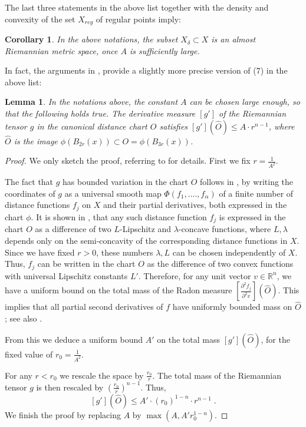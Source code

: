 \documentclass[12pt,leqno,intlimits]{amsart}
\numberwithin{equation}{section}
\newtheorem{lem}[thm]{Lemma}
\newtheorem{cor}[thm]{Corollary}
\theoremstyle{definition}
\theoremstyle{remark}
\newcommand{\R}{\mathbb{R}}
\begin{document}
  The last three statements in the above list together with the density and convexity of the set $X_{reg}$ of regular points imply:
  \begin{cor}
  In the above notations, the subset $X_{\delta} \subset X$ is an almost Riemannian metric space, once $A$ is sufficiently large.
  \end{cor}



In fact,  the arguments in \cite[4.2]{Per-DC},  provide a slightly more precise version of (7) in the above list:

\begin{lem} \label{lem:A}
In the notations above,  the constant $A$ can be chosen  large enough, so that the following holds true.    The derivative measure $[g']$ of the Riemannian tensor $g$
in the canonical distance chart $O$ satisfies $[g'] (\hat O) \leq A \cdot  r^{n-1} $, where $\hat O$ is the image $\phi (B_{2r} (x)) \subset O=
\phi (B_{3r} (x))$.
\end{lem}

\begin{proof}
We only sketch the proof, referring to \cite{Per-DC} for details. First we fix $r=\frac 1 {A^2}$.

The fact that $g$ has bounded variation in the chart $O$  follows in \cite[Section 4.2]{Per-DC},  by writing the coordinates of $g$
as  a universal  smooth map $\Phi (f_1,....,f_{\alpha})$    of a finite number of distance functions $f_j$  on $X$  and their partial derivatives, both  expressed in the chart $\phi$.
It is shown in \cite[Section 3]{Per-DC}, that any such distance function $f_j$  is expressed in the chart $O$ as a difference  of two  $L$-Lipschitz and $\lambda$-concave functions, where $L,\lambda$ depends only on the semi-concavity of the corresponding distance functions  in $X$. Since we have fixed $r>0$, these numbers $\lambda,L$ can  be chosen independently of $X$.
Thus, $f_j$ can be written in the chart $O$ as the  difference of two convex functions with universal Lipschitz constants $L'$.
Therefore, for any unit vector $v\in \R^n$, we have a uniform bound on the total mass of the
 Radon measure $[\frac {\partial ^2 f_j} {\partial ^2v}] (\hat O)$.
This implies that all partial second derivatives of $f$ have uniformly bounded mass on $\hat O$; see also \cite[Theorem 6.8]{Evans}.

From this we deduce a uniform bound  $A'$ on the total mass $[g'] (\hat O)$, for the fixed value of $r_0=\frac 1 {A^2}$.


For any $r<r_0$ we rescale the space by $\frac {r_0} r$.  The total mass of the Riemannian tensor $g$ is then rescaled
by $(\frac {r_0} r)^{n-1}$.   Thus,  $$[g'] (\hat O) \leq A'\cdot (r_0 ) ^{1-n} \cdot r^{n-1} \; .$$
We finish the proof by replacing $A$ by $\max(A, A' r_0^{1-n})$.
\end{proof}
\end{document}
